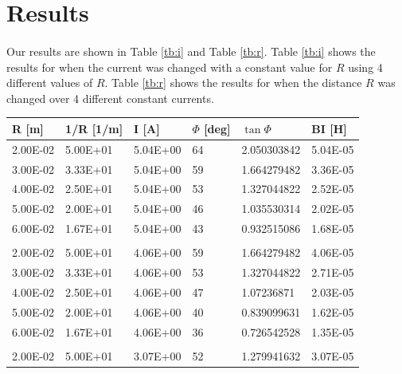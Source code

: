\documentclass{article}
\begin{document}
\section{Results}
\paragraph{}

Our results are shown in Table \ref{tb:i} and Table \ref{tb:r}. Table \ref{tb:i} shows the results for when the current was changed with a constant value for \(R\) using 4 different values of \(R\). Table \ref{tb:r} shows the results for when the distance \(R\) was changed over 4 different constant currents.

\begin{table}[H]
\begin{tabular}{|l|l|l|l|l|l|}
\hline
R {[}m{]} & 1/R {[}1/m{]} & I {[}A{]} & \(\Phi\) {[}deg{]} & \(\tan{\Phi}\)        & BI {[}H{]} \\ \hline
2.00E-02  & 5.00E+01      & 5.04E+00  & 64          & 2.050303842 & 5.04E-05   \\ \hline
3.00E-02  & 3.33E+01      & 5.04E+00  & 59          & 1.664279482 & 3.36E-05   \\ \hline
4.00E-02  & 2.50E+01      & 5.04E+00  & 53          & 1.327044822 & 2.52E-05   \\ \hline
5.00E-02  & 2.00E+01      & 5.04E+00  & 46          & 1.035530314 & 2.02E-05   \\ \hline
6.00E-02  & 1.67E+01      & 5.04E+00  & 43          & 0.932515086 & 1.68E-05   \\ \hline
          &               &           &             &             &            \\ \hline
2.00E-02  & 5.00E+01      & 4.06E+00  & 59          & 1.664279482 & 4.06E-05   \\ \hline
3.00E-02  & 3.33E+01      & 4.06E+00  & 53          & 1.327044822 & 2.71E-05   \\ \hline
4.00E-02  & 2.50E+01      & 4.06E+00  & 47          & 1.07236871  & 2.03E-05   \\ \hline
5.00E-02  & 2.00E+01      & 4.06E+00  & 40          & 0.839099631 & 1.62E-05   \\ \hline
6.00E-02  & 1.67E+01      & 4.06E+00  & 36          & 0.726542528 & 1.35E-05   \\ \hline
          &               &           &             &             &            \\ \hline
2.00E-02  & 5.00E+01      & 3.07E+00  & 52          & 1.279941632 & 3.07E-05   \\ \hline

\end{tabular}
\end{table}
\end{document}

